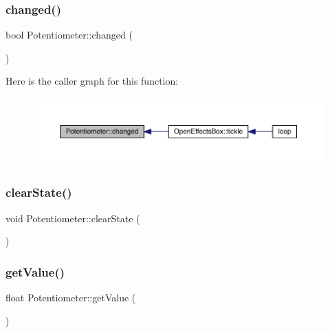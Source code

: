 \subsubsection{\texorpdfstring{changed()}{changed()}}
{\footnotesize\ttfamily bool Potentiometer\+::changed (\begin{DoxyParamCaption}{ }\end{DoxyParamCaption})}

Here is the caller graph for this function\+:\nopagebreak
\begin{figure}[H]
\begin{center}
\leavevmode
\includegraphics[width=350pt]{class_potentiometer_a518a49f1d9d85ae9bfea32fe6caff3e7_icgraph}
\end{center}
\end{figure}
\mbox{\label{class_potentiometer_a7307a8f883fb934f0440b2b4dc47b823}} 
\subsubsection{\texorpdfstring{clear\+State()}{clearState()}}
{\footnotesize\ttfamily void Potentiometer\+::clear\+State (\begin{DoxyParamCaption}{ }\end{DoxyParamCaption})}

\mbox{\label{class_potentiometer_a88c44aecdfce24a5dd0e719b94267dc6}} 
\subsubsection{\texorpdfstring{get\+Value()}{getValue()}}
{\footnotesize\ttfamily float Potentiometer\+::get\+Value (\begin{DoxyParamCaption}{ }\end{DoxyParamCaption})}

